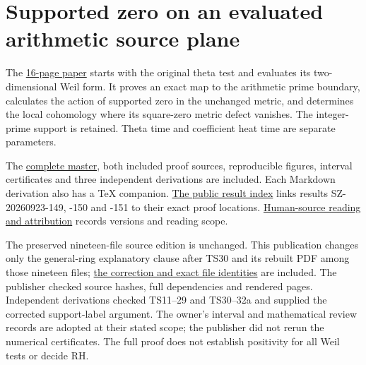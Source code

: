 \documentclass[
]{article}
\author{}
\date{}
\begin{document}
\section{Supported zero on an evaluated arithmetic source
plane}\label{supported-zero-on-an-evaluated-arithmetic-source-plane}

The \href{NOTE.pdf}{16-page paper} starts with the original theta test
and evaluates its two-dimensional Weil form. It proves an exact map to
the arithmetic prime boundary, calculates the action of supported zero
in the unchanged metric, and determines the local cohomology where its
square-zero metric defect vanishes. The integer-prime support is
retained. Theta time and coefficient heat time are separate parameters.

The \href{NOTE.tex}{complete master}, both included proof sources,
reproducible figures, interval certificates and three independent
derivations are included. Each Markdown derivation also has a TeX
companion. \href{PUBLIC_RESULT_INDEX.json}{The public result index}
links results SZ-20260923-149, -150 and -151 to their exact proof
locations. \href{SOURCE_READING.json}{Human-source reading and
attribution} records versions and reading scope.

The preserved nineteen-file source edition is unchanged. This
publication changes only the general-ring explanatory clause after TS30
and its rebuilt PDF among those nineteen files; \href{CORRECTION.md}{the
correction and exact file identities} are included. The publisher
checked source hashes, full dependencies and rendered pages. Independent
derivations checked TS11--29 and TS30--32a and supplied the corrected
support-label argument. The owner's interval and mathematical review
records are adopted at their stated scope; the publisher did not rerun
the numerical certificates. The full proof does not establish positivity
for all Weil tests or decide RH.
\end{document}
